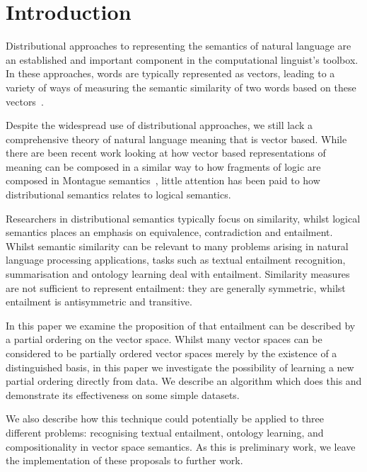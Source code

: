 \section{Introduction}

Distributional approaches to representing the semantics of natural language
are an established and important component in the computational
linguist's toolbox. In these approaches, words are typically
represented as vectors, leading to a variety of ways of measuring the semantic 
similarity of two words based on these vectors~\cite{Lee:99}. 

Despite the widespread use of distributional approaches, we still lack a comprehensive theory
of natural language meaning that is vector based. While there are been recent work  
looking at how vector based 
representations of meaning can be composed in a
similar way to how fragments of logic are composed in Montague 
semantics~\cite{Clark:08,Grefenstette:11},  
little attention has been paid to how 
distributional semantics relates to logical semantics. 

Researchers in distributional semantics typically focus
on similarity, whilst logical semantics places an emphasis on
equivalence, contradiction and entailment. Whilst semantic similarity can be
relevant to many problems arising in natural language processing applications, 
tasks such as textual entailment recognition, summarisation and ontology learning
deal with entailment. Similarity measures are not sufficient to
represent entailment: they are generally symmetric, whilst entailment
is antisymmetric and transitive.

In this paper we examine the proposition of  that
entailment can be described by a partial ordering on the vector
space. Whilst many vector spaces can be considered to be partially
ordered vector spaces merely by the existence of a distinguished
basis, in this paper we investigate the possibility of learning a new
partial ordering directly from data. We describe an algorithm which
does this and demonstrate its effectiveness on some simple datasets.

We also describe how this technique could potentially be applied to
three different problems: recognising textual entailment, ontology
learning, and compositionality in vector space semantics. As this is
preliminary work, we leave the implementation of these proposals to
further work.
